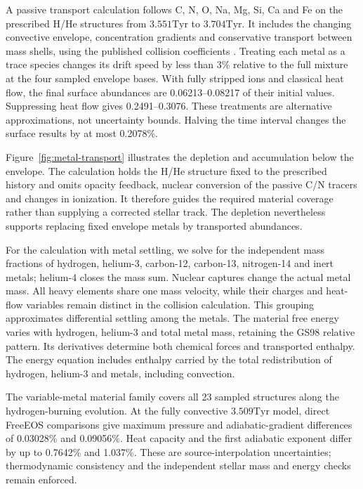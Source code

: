 \documentclass[11pt,letterpaper]{article}
\newcommand{\Tyr}{\mathrm{Tyr}}
\begin{document}
A passive transport calculation follows C, N, O, Na, Mg, Si, Ca and Fe on
the prescribed H/He structures from $3.551\Tyr$ to $3.704\Tyr$. It includes
the changing convective envelope, concentration gradients and conservative
transport between mass shells, using the published collision coefficients
\cite{thoul94}. Treating each metal as a trace species changes its drift
speed by less than 3\% relative to the full mixture at the four sampled
envelope bases. With fully stripped ions and classical heat flow, the final
surface abundances are 0.06213--0.08217 of their initial values. Suppressing
heat flow gives 0.2491--0.3076. These treatments are alternative
approximations, not uncertainty bounds. Halving the time interval changes
the surface results by at most 0.2078\%.

Figure~\ref{fig:metal-transport} illustrates the depletion and accumulation
below the envelope. The calculation holds the H/He structure fixed to the
prescribed history and omits opacity feedback, nuclear conversion of the
passive C/N tracers and changes in ionization. It therefore guides the
required material coverage rather than supplying a corrected stellar track.
The depletion nevertheless supports replacing fixed envelope metals by
transported abundances.

For the calculation with metal settling, we solve for the independent mass
fractions of hydrogen, helium-3, carbon-12, carbon-13, nitrogen-14 and inert
metals; helium-4 closes the mass sum. Nuclear captures change the actual
metal mass. All heavy elements share one mass velocity, while their charges
and heat-flow variables remain distinct in the collision calculation.
This grouping approximates differential settling among the metals.
The material free energy varies with hydrogen, helium-3 and total metal
mass, retaining the GS98 relative pattern. Its derivatives determine both
chemical forces and transported enthalpy. The energy equation includes
enthalpy carried by the total redistribution of hydrogen, helium-3 and
metals, including convection.

The variable-metal material family covers all 23 sampled structures along
the hydrogen-burning evolution. At the fully convective $3.509\Tyr$ model,
direct FreeEOS comparisons give maximum pressure and adiabatic-gradient
differences of 0.03028\% and 0.09056\%. Heat capacity and the first adiabatic
exponent differ by up to 0.7642\% and 1.037\%. These are source-interpolation
uncertainties; thermodynamic consistency and the independent stellar mass
and energy checks remain enforced.
\end{document}
